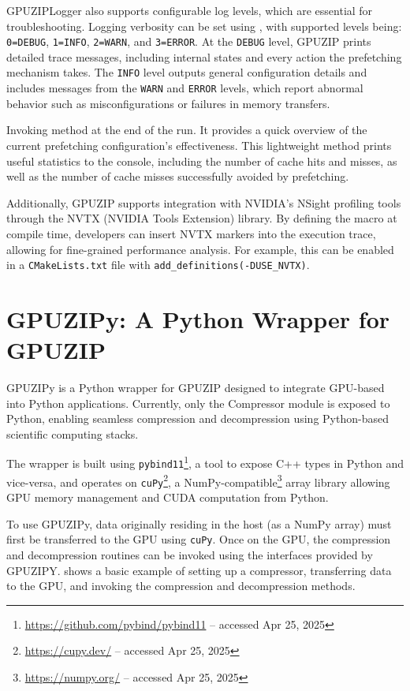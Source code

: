 \documentclass[Ingles,Final]{ic-tese-v3}
\begin{document}
GPUZIPLogger also supports configurable log levels, which are essential for troubleshooting. Logging verbosity can be set using , with supported levels being: \texttt{0=DEBUG}, \texttt{1=INFO}, \texttt{2=WARN}, and \texttt{3=ERROR}. At the \texttt{DEBUG} level, GPUZIP prints detailed trace messages, including internal \cache states and every action the prefetching mechanism takes. The \texttt{INFO} level outputs general configuration details and includes messages from the \texttt{WARN} and \texttt{ERROR} levels, which report abnormal behavior such as misconfigurations or failures in memory transfers.

Invoking  method at the end of the run. It provides a quick overview of the current prefetching configuration's effectiveness. This lightweight method prints useful statistics to the console, including the number of cache hits and misses, as well as the number of cache misses successfully avoided by prefetching.

Additionally, GPUZIP supports integration with NVIDIA's NSight profiling tools through the NVTX (NVIDIA Tools Extension) library. By defining the macro  at compile time, developers can insert NVTX markers into the execution trace, allowing for fine-grained performance analysis. For example, this can be enabled in a \texttt{CMakeLists.txt} file with \texttt{add\_definitions(-DUSE\_NVTX)}.

\section{GPUZIPy: A Python Wrapper for GPUZIP}
\label{sec:gpuzipy}

GPUZIPy is a Python wrapper for GPUZIP designed to integrate GPU-based \compression into Python applications. Currently, only the Compressor module is exposed to Python, enabling seamless compression and decompression using Python-based scientific computing stacks.

The wrapper is built using \texttt{pybind11}\footnote{\url{https://github.com/pybind/pybind11} -- accessed Apr 25, 2025}, a tool to expose C++ types in Python and vice-versa, and operates on \texttt{cuPy}\footnote{\url{https://cupy.dev/} -- accessed Apr 25, 2025}, a NumPy-compatible\footnote{\url{https://numpy.org/} -- accessed Apr 25, 2025} array library allowing GPU memory management and CUDA computation from Python.

To use GPUZIPy, data originally residing in the host (as a NumPy array) must first be transferred to the GPU using \texttt{cuPy}. Once on the GPU, the compression and decompression routines can be invoked using the interfaces provided by GPUZIPY.  shows a basic example of setting up a compressor, transferring data to the GPU, and invoking the compression and decompression methods.
\end{document}
